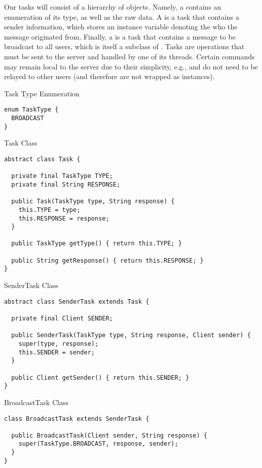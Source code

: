 Our tasks will consist of a hierarchy of objects. Namely, a  contains an enumeration of its type, as well as the raw data. A  is a task that contains a sender information, which stores an instance variable denoting the  who the message originated from. Finally, a  is a task that contains a message to be broadcast to all users, which is itself a subclass of . Tasks are operations that must be sent to the server and handled by one of its threads. Certain commands may remain local to the server due to their simplicity, e.g.,  and  do not need to be relayed to other users (and therefore are not wrapped as  instances). 

\begin{cl}{Task Type Enumeration}
\begin{lstlisting}[language=MyJava]
enum TaskType {
  BROADCAST
}
\end{lstlisting}
\end{cl}

\begin{cl}{Task Class}
\begin{lstlisting}[language=MyJava]
abstract class Task {

  private final TaskType TYPE;
  private final String RESPONSE;

  public Task(TaskType type, String response) {
    this.TYPE = type;
    this.RESPONSE = response;
  }

  public TaskType getType() { return this.TYPE; }

  public String getResponse() { return this.RESPONSE; }
}
\end{lstlisting}
\end{cl}

\begin{cl}{SenderTask Class}
\begin{lstlisting}[language=MyJava]
abstract class SenderTask extends Task {

  private final Client SENDER;

  public SenderTask(TaskType type, String response, Client sender) {
    super(type, response);
    this.SENDER = sender;
  }

  public Client getSender() { return this.SENDER; }
}
\end{lstlisting}
\end{cl}

\begin{cl}{BroadcastTask Class}
\begin{lstlisting}[language=MyJava]
class BroadcastTask extends SenderTask {

  public BroadcastTask(Client sender, String response) {
    super(TaskType.BROADCAST, response, sender);
  }
}
\end{lstlisting}
\end{cl}

